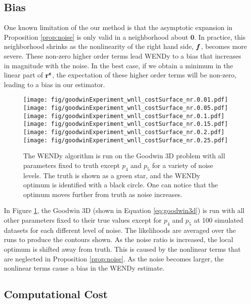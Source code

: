 \subsection{Bias} 

One known limitation of the our method is that the asymptotic expansion in Proposition \ref{prop:noise} is only valid in a neighborhood about $\mathbf{0}$. In practice, this neighborhood shrinks as the nonlinearity of the right hand side, $\boldsymbol{f}$, becomes more severe. These non-zero higher order terms lead WENDy to a bias that increases in magnitude with the noise. In the best case, if we obtain a minimum in the linear part of $\mathbf{r}^{\boldsymbol{\varepsilon}}$, the expectation of these higher order terms will be non-zero, leading to a bias in our estimator.

\begin{figure}[ht]
    \centering
    \texttt{[image: fig/goodwinExperiment\_wnll\_costSurface\_nr.0.01.pdf]}
    \texttt{[image: fig/goodwinExperiment\_wnll\_costSurface\_nr.0.05.pdf]}
    \texttt{[image: fig/goodwinExperiment\_wnll\_costSurface\_nr.0.1.pdf]}
    \texttt{[image: fig/goodwinExperiment\_wnll\_costSurface\_nr.0.15.pdf]}
    \texttt{[image: fig/goodwinExperiment\_wnll\_costSurface\_nr.0.2.pdf]}
    \texttt{[image: fig/goodwinExperiment\_wnll\_costSurface\_nr.0.25.pdf]}
    \caption{The WENDy algorithm is run on the Goodwin 3D problem with all parameters fixed to truth except $p_4$ and $p_5$ for a variety of noise levels. The truth is shown as a green star, and the WENDy optimum is identified with a black circle. One can notice that the optimum moves further from truth as noise increases.}
    \label{fig:bias}
\end{figure}

In Figure \ref{fig:bias}, the Goodwin 3D (shown in Equation \eqref{eq:goodwin3d}) is run with all other parameters fixed to their true values except for $p_4$ and $p_5$ at 100 simulated datasets for each different level of noise. The likelihoods are averaged over the runs to produce the contours shown. As the noise ratio is increased, the local optimum is shifted away from truth. This is caused by the nonlinear terms that are neglected in Proposition \ref{prop:noise}. As the noise becomes larger, the nonlinear terms cause a bias in the WENDy estimate.

\subsection{Computational Cost} 

